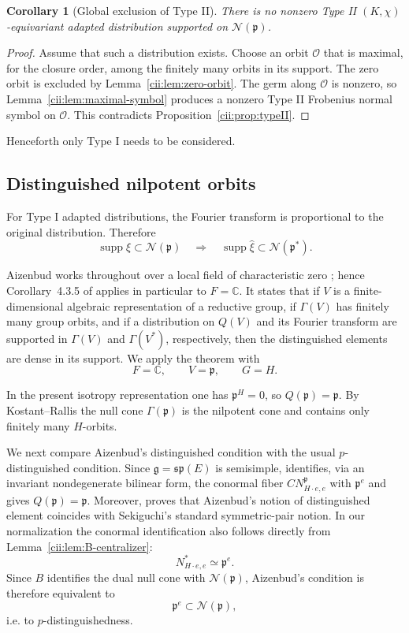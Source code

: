 \documentclass[10pt,a4paper]{amsart}
\numberwithin{equation}{section}
\newtheorem{corollary}[theorem]{Corollary}
\newcommand{\C}{\mathbb C}
\newcommand{\supp}{\operatorname{supp}}
\newcommand{\cN}{\mathcal N}
\begin{document}
\begin{corollary}[Global exclusion of Type II]
\label{cii:cor:no-typeII-distribution}
There is no nonzero Type II $(K,\chi)$-equivariant adapted distribution
supported on $\cN(\mathfrak p)$.
\end{corollary}

\begin{proof}
Assume that such a distribution exists.  Choose an orbit $\mathcal O$ that is
maximal, for the closure order, among the finitely many orbits in its support.
The zero orbit is excluded by Lemma~\ref{cii:lem:zero-orbit}.  The germ along
$\mathcal O$ is nonzero, so Lemma~\ref{cii:lem:maximal-symbol} produces a
nonzero Type II Frobenius normal symbol on $\mathcal O$.  This contradicts
Proposition~\ref{cii:prop:typeII}.
\end{proof}

Henceforth only Type I needs to be considered.

\subsection{Distinguished nilpotent orbits}\label{cii:sec:distinguished}

For Type I adapted distributions, the Fourier transform is proportional to
the original distribution.  Therefore
\[
\supp\xi\subset\cN(\mathfrak p)
\quad\Longrightarrow\quad
\supp\widehat{\xi}\subset\cN(\mathfrak p^*).
\]

Aizenbud works throughout over a local field of characteristic zero
\cite[\S2]{Aiz13}; hence Corollary~4.3.5 of \cite{Aiz13} applies in
particular to \(F=\C\).  It states that
if \(V\) is a finite-dimensional algebraic representation of a reductive group, if
\(\Gamma(V)\) has finitely many group orbits, and if a distribution on
\(Q(V)\) and its Fourier transform are supported in
\(\Gamma(V)\) and \(\Gamma(V^*)\), respectively, then the distinguished
elements are dense in its support.  We apply the theorem with
\[
F=\C,\qquad V=\mathfrak p,\qquad G=H.
\]

In the present isotropy representation one has \(\mathfrak p^H=0\), so
\(Q(\mathfrak p)=\mathfrak p\).  By Kostant--Rallis \cite{KR} the null cone
\(\Gamma(\mathfrak p)\) is the nilpotent cone and contains only finitely
many \(H\)-orbits.

We next compare Aizenbud's distinguished condition with the usual
\(p\)-distinguished condition.  Since
\(\mathfrak g=\mathfrak{sp}(E)\) is semisimple,
\cite[Lemma~5.1.40]{Aiz13} identifies, via an invariant
nondegenerate bilinear form, the conormal fiber
\(CN^{\mathfrak p}_{H\cdot e,e}\) with \(\mathfrak p^e\) and gives
\(Q(\mathfrak p)=\mathfrak p\).  Moreover,
\cite[Lemma~5.2.2]{Aiz13} proves that Aizenbud's notion of
distinguished element coincides with Sekiguchi's standard symmetric-pair
notion.  In our normalization the conormal identification also follows
directly from Lemma~\ref{cii:lem:B-centralizer}:
\[
  N^*_{H\cdot e,e}\simeq\mathfrak p^e.
\]
Since \(B\) identifies the dual null cone with \(\mathcal N(\mathfrak p)\),
Aizenbud's condition is therefore equivalent to
\[
  \mathfrak p^e\subset\mathcal N(\mathfrak p),
\]
i.e. to \(p\)-distinguishedness.
\end{document}
